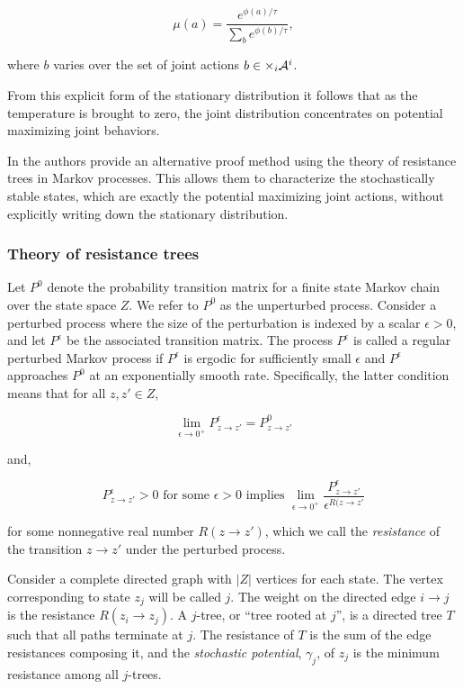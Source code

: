 $$
\mu(a) = \dfrac{e^{\phi(a)/\tau}}{\sum_{b} e^{\phi(b)/\tau}},
$$

\noindent where $b$ varies over the set of joint actions $b \in \times_i \AA^i$.

From this explicit form of the stationary distribution it follows that as the temperature is brought to zero, the joint distribution concentrates on potential maximizing joint behaviors.


In \cite{marden2012revisiting} the authors provide an alternative proof method using the theory of resistance trees in Markov processes. This allows them to characterize the stochastically stable states, which are exactly the potential maximizing joint actions, without explicitly writing down the stationary distribution.

\subsubsection{Theory of resistance trees}

Let $P^0$ denote the probability transition matrix for a finite state Markov chain over the state space $Z$. We refer to $P^0$ as the unperturbed process. Consider a perturbed process where the size of the perturbation is indexed by a scalar $\epsilon > 0$, and let $P^{\epsilon}$ be the associated transition matrix. The process $P^{\epsilon}$ is called a regular perturbed Markov process if $P^{\epsilon}$ is ergodic for sufficiently small $\epsilon$ and $P^{\epsilon}$ approaches $P^0$ at an exponentially smooth rate. Specifically, the latter condition means that for all $z, z' \in Z$,

$$
\lim_{\epsilon \rightarrow 0^+} P^{\epsilon}_{z \rightarrow z'} = P^0_{z \rightarrow z'}
$$

and,

$$
P^{\epsilon}_{z \rightarrow z'} > 0 \mbox{ for some } \epsilon > 0 \mbox{ implies } \lim_{\epsilon \rightarrow 0^+} \dfrac{P^{\epsilon}_{z \rightarrow z'}}{\epsilon^{R(z \rightarrow z'}}
$$

for some nonnegative real number $R(z \rightarrow z')$, which we call the {\em resistance} of the transition $z \rightarrow z'$ under the perturbed process. 

Consider a complete directed graph with $|Z|$ vertices for each state. The vertex corresponding to state $z_j$ will be called $j$. The weight on the directed edge $i \rightarrow j$ is the resistance $R(z_i \rightarrow z_j)$. A $j$-tree, or ``tree rooted at $j$'', is a directed tree $T$ such that all paths terminate at $j$. The resistance of $T$ is the sum of the edge resistances composing it, and the {\em stochastic potential}, $\gamma_j$, of $z_j$ is the minimum resistance among all $j$-trees.

